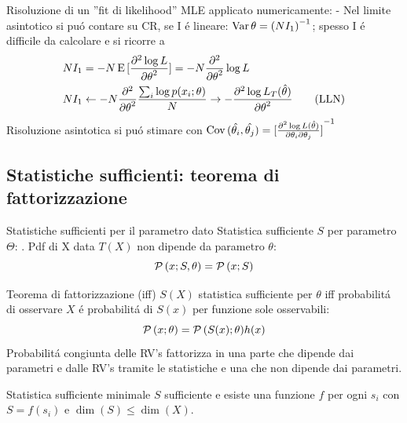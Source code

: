 \documentclass[asd-beamer.tex]{subfiles}%
\begin{document}
\begin{frame}{Risoluzione di un ''fit di likelihood''}\frameintoc
MLE applicato numericamente:  - Nel limite asintotico si pu\'o contare su CR, se I \'e lineare: $\operatorname{Var}{\theta}={(NI_1)}^{-1}$; spesso I \'e difficile da calcolare e si ricorre a
\begin{align*}
&NI_1=-N\operatorname{E}{[\frac{\partial^2 \log{L}}{{\partial \theta}^2}]}=-N\frac{\partial^2}{{\partial \theta}^2}\log{L}\\
&NI_1\gets-N\frac{\partial^2}{{\partial \theta}^2}\frac{\sum_i\log{p(x_i;\theta)}}{N}\to-\frac{\partial^2 \log{L_T(\hat{\theta})}}{{\partial \theta}^2}\tag{LLN}
\end{align*}
Risoluzione asintotica si pu\'o stimare con $\operatorname{Cov}{(\hat{\theta_i},\hat{\theta_j})}={[\frac{\partial^2\log{L(\hat{\theta})}}{\partial\theta_i\partial\theta_j}]}^{-1}$
\end{frame}

\subsection{Statistiche sufficienti: teorema di fattorizzazione}

\begin{frame}{Statistiche sufficienti per il parametro dato}
Statistica sufficiente $S$ per parametro $\Theta$: . Pdf di X data $T(X)$ non dipende da parametro $\theta$:
\[\operatorname{\mathcal{P}}{(x;S,\theta)}=\operatorname{\mathcal{P}}{(x;S)}\]
\begin{block}{Teorema di fattorizzazione (iff)}
$S(X)$ statistica sufficiente per $\theta$ iff probabilit\'a di osservare $X$ \'e probabilit\'a di $S(x)$ per funzione sole osservabili: \[\operatorname{\mathcal{P}}{(x;\theta)}=\operatorname{\mathcal{P}}{(S(x);\theta)}h(x)\]
Probabilit\'a congiunta delle RV's fattorizza in una parte che dipende dai parametri e dalle RV's tramite le statistiche e una che non dipende dai parametri.
\end{block}
\begin{block}{Statistica sufficiente minimale}
$S$ sufficiente e esiste una funzione $f$ per ogni $s_i$ con $S=f(s_i)$ e $\dim({S})\leq\dim{(X)}$.
\end{block}
\end{frame}
\end{document}
